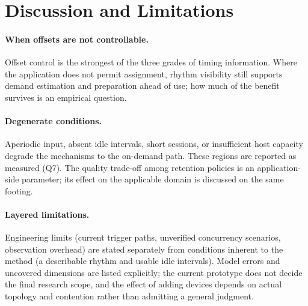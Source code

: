 \section{Discussion and Limitations}
\label{sec:discussion}


\paragraph{When offsets are not controllable.}
Offset control is the strongest of the three grades of timing information.
Where the application does not permit assignment, rhythm visibility still
supports demand estimation and preparation ahead of use; how much of the
benefit survives is an empirical question.

\paragraph{Degenerate conditions.}
Aperiodic input, absent idle intervals, short sessions, or insufficient host
capacity degrade the mechanisms to the on-demand path. These regions are
reported as measured (Q7). The quality trade-off among retention policies is
an application-side parameter; its effect on the applicable domain is
discussed on the same footing.

\paragraph{Layered limitations.}
Engineering limits (current trigger paths, unverified concurrency scenarios,
observation overhead) are stated separately from conditions inherent to the
method (a describable rhythm and usable idle intervals). Model errors and
uncovered dimensions are listed explicitly; the current prototype does not
decide the final research scope, and the effect of adding devices depends on
actual topology and contention rather than admitting a general judgment.
